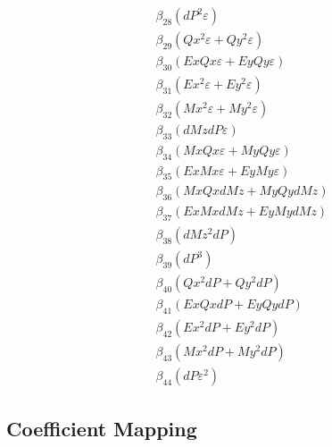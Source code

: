 \documentclass{article}
\begin{document}
\begin{align*}
&\quad \beta_{28} \left(dP^{2} ε\right) \\
&\quad \beta_{29} \left(Qx^{2} ε + Qy^{2} ε\right) \\
&\quad \beta_{30} \left(Ex Qx ε + Ey Qy ε\right) \\
&\quad \beta_{31} \left(Ex^{2} ε + Ey^{2} ε\right) \\
&\quad \beta_{32} \left(Mx^{2} ε + My^{2} ε\right) \\
&\quad \beta_{33} \left(dMz dP ε\right) \\
&\quad \beta_{34} \left(Mx Qx ε + My Qy ε\right) \\
&\quad \beta_{35} \left(Ex Mx ε + Ey My ε\right) \\
&\quad \beta_{36} \left(Mx Qx dMz + My Qy dMz\right) \\
&\quad \beta_{37} \left(Ex Mx dMz + Ey My dMz\right) \\
&\quad \beta_{38} \left(dMz^{2} dP\right) \\
&\quad \beta_{39} \left(dP^{3}\right) \\
&\quad \beta_{40} \left(Qx^{2} dP + Qy^{2} dP\right) \\
&\quad \beta_{41} \left(Ex Qx dP + Ey Qy dP\right) \\
&\quad \beta_{42} \left(Ex^{2} dP + Ey^{2} dP\right) \\
&\quad \beta_{43} \left(Mx^{2} dP + My^{2} dP\right) \\
&\quad \beta_{44} \left(dP ε^{2}\right)
\end{align*}

\subsection*{Coefficient Mapping}
\end{document}
